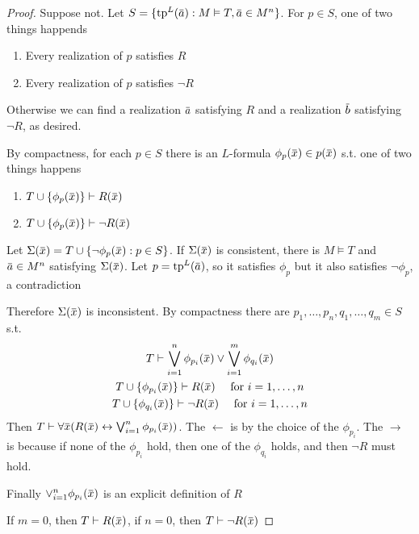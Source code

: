 \documentclass[11pt]{article}
\begin{document}
\begin{proof}
Suppose not. Let \(S=\{\tp^L(\bara):M\vDash T,\bara\in M^n\}\). For \(p\in S\), one of two things happends
\begin{enumerate}
\item Every realization of \(p\) satisfies \(R\)
\item Every realization of \(p\) satisfies \(\neg R\)
\end{enumerate}


Otherwise we can find a realization \(\bara\) satisfying \(R\) and a realization \(\barb\)
satisfying \(\neg R\), as desired.

By compactness, for each \(p\in S\) there is an \(L\)-formula \(\phi_p(\barx)\in p(\barx)\)  s.t. one
of two things happens
\begin{enumerate}
\item \(T\cup\{\phi_p(\barx)\}\vdash R(\barx)\)
\item \(T\cup\{\phi_p(\barx)\}\vdash\neg R(\barx)\)
\end{enumerate}


Let \(\Sigma(\barx)=T\cup\{\neg\phi_p(\barx):p\in S\}\). If \(\Sigma(\barx)\) is consistent, there is \(M\vDash T\)
and \(\bara\in M^n\) satisfying \(\Sigma(\barx)\). Let \(p=\tp^L(\bara)\), so it satisfies \(\phi_p\) but it
also satisfies \(\neg\phi_p\), a contradiction

Therefore \(\Sigma(\barx)\) is inconsistent. By compactness there are \(p_1,\dots,p_n,q_1,\dots,q_m\in S\) s.t.
\begin{gather*}
T\vdash\bigvee_{i=1}^n\phi_{p_i}(\barx)\vee\bigvee_{i=1}^m\phi_{q_i}(\barx)\\
T\cup\{\phi_{p_i}(\barx)\}\vdash R(\barx)\quad\text{ for }i=1,\dots,n\\
T\cup\{\phi_{q_i}(\barx)\}\vdash \neg R(\barx)\quad\text{ for }i=1,\dots,n\\
\end{gather*}
Then \(T\vdash\forall\barx(R(\barx)\leftrightarrow\bigvee_{i=1}^n\phi_{p_i}(\barx))\). The \(\leftarrow\) is by the choice of the \(\phi_{p_i}\).
The \(\to\) is because if none of the \(\phi_{p_i}\) hold, then one of the \(\phi_{q_i}\) holds, and
then \(\neg R\) must hold.

Finally \(\vee_{i=1}^n\phi_{p_i}(\barx)\) is an explicit definition of \(R\)

If \(m=0\), then \(T\vdash R(\barx)\), if \(n=0\), then \(T\vdash \neg R(\barx)\)
\end{proof}
\end{document}
